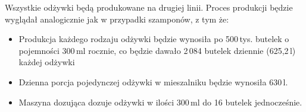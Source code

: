 Wszystkie odżywki będą produkowane na drugiej linii. Proces produkcji będzie wyglądał analogicznie jak w przypadki szamponów, z tym że:
\begin{itemize}
	\item Produkcja każdego rodzaju odżywki będzie wynosiła po 500\,tys. butelek o pojemności 300\,ml rocznie, co będzie dawało 2\,084 butelek dziennie (625,2\,l) każdej odżywki
	\item Dzienna porcja pojedynczej odżywki w mieszalniku będzie wynosiła 630\,l.
	\item Maszyna dozująca dozuje odżywki w ilości 300\,ml do 16 butelek jednocześnie.
\end{itemize}
